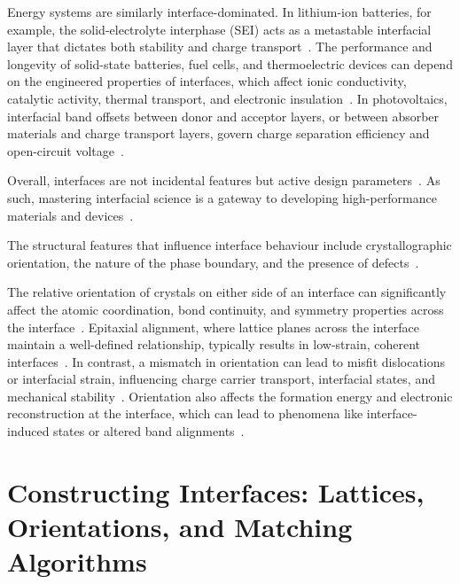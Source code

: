 \label{energy_interfaces} Energy systems are similarly interface-dominated. %
In lithium-ion batteries, for example, the solid-electrolyte interphase (SEI) acts as a metastable interfacial layer that dictates both stability and charge transport~\cite{Butler2019-ws}.
The performance and longevity of solid-state batteries, fuel cells, and thermoelectric devices can depend on the engineered properties of interfaces, which affect ionic conductivity, catalytic activity, thermal transport, and electronic insulation~\cite{Leitherer2023-ew}.
In photovoltaics, interfacial band offsets between donor and acceptor layers, or between absorber materials and charge transport layers, govern charge separation efficiency and open-circuit voltage~\cite{Low2025-on}.

\label{interface_design_parameters} Overall, interfaces are not incidental features but active design parameters~\nocite{}. %
As such, mastering interfacial science is a gateway to developing high-performance materials and devices~\nocite{}.

\label{interface_definition} The structural features that influence interface behaviour include crystallographic orientation, the nature of the phase boundary, and the presence of defects~\cite{Zhang2016-lt}.

\label{orientation_effects} The relative orientation of crystals on either side of an interface can significantly affect the atomic coordination, bond continuity, and symmetry properties across the interface~\cite{Kuhbach2021-gz, Zhang2016-lt}.
Epitaxial alignment, where lattice planes across the interface maintain a well-defined relationship, typically results in low-strain, coherent interfaces~\cite{Davies2024-ju}.
In contrast, a mismatch in orientation can lead to misfit dislocations or interfacial strain, influencing charge carrier transport, interfacial states, and mechanical stability~\cite{Gerber2023-yd, Leung2020-tv, Leitherer2023-ew}.
Orientation also affects the formation energy and electronic reconstruction at the interface, which can lead to phenomena like interface-induced states or altered band alignments~\cite{Alam2020-ci, Chagarov2015-ol, Zhang2016-lt}.

\newpage \section{Constructing Interfaces: Lattices, Orientations, and Matching Algorithms}\label{sec:constructing_interfaces}

